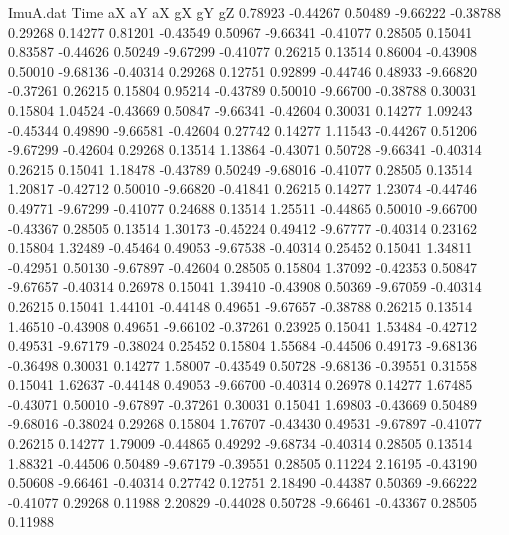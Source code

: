 \begin{filecontents}{ImuA.dat}
Time aX aY aX gX gY gZ
   0.78923   -0.44267    0.50489   -9.66222   -0.38788    0.29268    0.14277
   0.81201   -0.43549    0.50967   -9.66341   -0.41077    0.28505    0.15041
   0.83587   -0.44626    0.50249   -9.67299   -0.41077    0.26215    0.13514
   0.86004   -0.43908    0.50010   -9.68136   -0.40314    0.29268    0.12751
   0.92899   -0.44746    0.48933   -9.66820   -0.37261    0.26215    0.15804
   0.95214   -0.43789    0.50010   -9.66700   -0.38788    0.30031    0.15804
   1.04524   -0.43669    0.50847   -9.66341   -0.42604    0.30031    0.14277
   1.09243   -0.45344    0.49890   -9.66581   -0.42604    0.27742    0.14277
   1.11543   -0.44267    0.51206   -9.67299   -0.42604    0.29268    0.13514
   1.13864   -0.43071    0.50728   -9.66341   -0.40314    0.26215    0.15041
   1.18478   -0.43789    0.50249   -9.68016   -0.41077    0.28505    0.13514
   1.20817   -0.42712    0.50010   -9.66820   -0.41841    0.26215    0.14277
   1.23074   -0.44746    0.49771   -9.67299   -0.41077    0.24688    0.13514
   1.25511   -0.44865    0.50010   -9.66700   -0.43367    0.28505    0.13514
   1.30173   -0.45224    0.49412   -9.67777   -0.40314    0.23162    0.15804
   1.32489   -0.45464    0.49053   -9.67538   -0.40314    0.25452    0.15041
   1.34811   -0.42951    0.50130   -9.67897   -0.42604    0.28505    0.15804
   1.37092   -0.42353    0.50847   -9.67657   -0.40314    0.26978    0.15041
   1.39410   -0.43908    0.50369   -9.67059   -0.40314    0.26215    0.15041
   1.44101   -0.44148    0.49651   -9.67657   -0.38788    0.26215    0.13514
   1.46510   -0.43908    0.49651   -9.66102   -0.37261    0.23925    0.15041
   1.53484   -0.42712    0.49531   -9.67179   -0.38024    0.25452    0.15804
   1.55684   -0.44506    0.49173   -9.68136   -0.36498    0.30031    0.14277
   1.58007   -0.43549    0.50728   -9.68136   -0.39551    0.31558    0.15041
   1.62637   -0.44148    0.49053   -9.66700   -0.40314    0.26978    0.14277
   1.67485   -0.43071    0.50010   -9.67897   -0.37261    0.30031    0.15041
   1.69803   -0.43669    0.50489   -9.68016   -0.38024    0.29268    0.15804
   1.76707   -0.43430    0.49531   -9.67897   -0.41077    0.26215    0.14277
   1.79009   -0.44865    0.49292   -9.68734   -0.40314    0.28505    0.13514
   1.88321   -0.44506    0.50489   -9.67179   -0.39551    0.28505    0.11224
   2.16195   -0.43190    0.50608   -9.66461   -0.40314    0.27742    0.12751
   2.18490   -0.44387    0.50369   -9.66222   -0.41077    0.29268    0.11988
   2.20829   -0.44028    0.50728   -9.66461   -0.43367    0.28505    0.11988

\end{filecontents}
